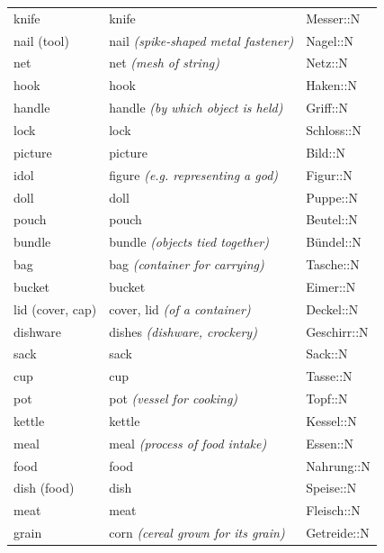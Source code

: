 \begin{center}
\begin{longtable}{lll}
{\sc \lowercase{	KNIFE	}}	&	knife		&	Messer::N	\\
{\sc \lowercase{	NAIL \footnotesize (TOOL)	}}	&	nail	\textit{\footnotesize (spike-shaped metal fastener)}	&	Nagel::N	\\
{\sc \lowercase{	NET	}}	&	net	\textit{\footnotesize (mesh of string)}	&	Netz::N	\\
{\sc \lowercase{	HOOK	}}	&	hook		&	Haken::N	\\
{\sc \lowercase{	HANDLE	}}	&	handle	\textit{\footnotesize (by which object is held)}	&	Griff::N	\\
{\sc \lowercase{	LOCK	}}	&	lock		&	Schloss::N	\\
{\sc \lowercase{	PICTURE	}}	&	picture		&	Bild::N	\\
{\sc \lowercase{	IDOL	}}	&	figure	\textit{\footnotesize (e.g. representing a god)}	&	Figur::N	\\
{\sc \lowercase{	DOLL	}}	&	doll		&	Puppe::N	\\
{\sc \lowercase{	POUCH	}}	&	pouch		&	Beutel::N	\\
{\sc \lowercase{	BUNDLE	}}	&	bundle	\textit{\footnotesize (objects tied together)}	&	Bündel::N	\\
{\sc \lowercase{	BAG	}}	&	bag	\textit{\footnotesize (container for carrying)}	&	Tasche::N	\\
{\sc \lowercase{	BUCKET	}}	&	bucket		&	Eimer::N	\\
{\sc \lowercase{	LID \footnotesize (COVER, CAP)	}}	&	cover, lid	\textit{\footnotesize (of a container)}	&	Deckel::N	\\
{\sc \lowercase{	DISHWARE	}}	&	dishes	\textit{\footnotesize (dishware, crockery)}	&	Geschirr::N	\\
{\sc \lowercase{	SACK	}}	&	sack		&	Sack::N	\\
{\sc \lowercase{	CUP	}}	&	cup		&	Tasse::N	\\
{\sc \lowercase{	POT	}}	&	pot	\textit{\footnotesize (vessel for cooking)}	&	Topf::N	\\
{\sc \lowercase{	KETTLE	}}	&	kettle		&	Kessel::N	\\
{\sc \lowercase{	MEAL	}}	&	meal	\textit{\footnotesize (process of food intake)}	&	Essen::N	\\
{\sc \lowercase{	FOOD	}}	&	food		&	Nahrung::N	\\
{\sc \lowercase{	DISH \footnotesize (FOOD)	}}	&	dish		&	Speise::N	\\
{\sc \lowercase{	MEAT	}}	&	meat		&	Fleisch::N	\\
{\sc \lowercase{	GRAIN	}}	&	corn	\textit{\footnotesize (cereal grown for its grain)}	&	Getreide::N	\\

\end{longtable}
\end{center}
